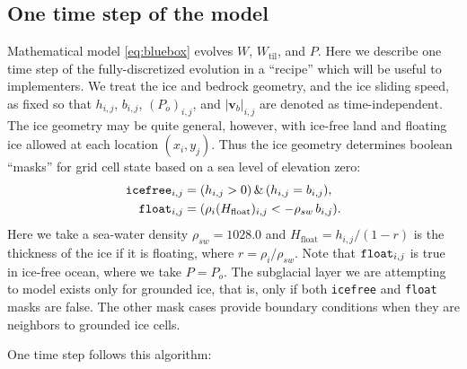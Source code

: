 \documentclass[11pt,final]{amsart}
\newcommand\bv{\mathbf{v}}
\newcommand{\Wtil}{W_{\text{til}}}
\begin{document}
\subsection*{One time step of the model}  Mathematical model \eqref{eq:bluebox} evolves $W$, $\Wtil$, and $P$.  Here we describe one time step of the fully-discretized evolution in a ``recipe'' which will be useful to implementers.  We treat the ice and bedrock geometry, and the ice sliding speed, as fixed so that $h_{i,j}$, $b_{i,j}$, $(P_o)_{i,j}$, and $|\bv_b|_{i,j}$ are denoted as time-independent.  The ice geometry may be quite general, however, with ice-free land and floating ice allowed at each location $(x_i,y_j)$.  Thus the ice geometry determines boolean ``masks'' for grid cell state based on a sea level of elevation zero:
\begin{align*}
\text{\texttt{icefree}}_{i,j} &= (h_{i,j} > 0)\, \&\, (h_{i,j} = b_{i,j}), \\
\text{\texttt{float}}_{i,j}   &= (\rho_i (H_{\text{float}})_{i,j} < - \rho_{sw}\, b_{i,j}).
\end{align*}
Here we take a sea-water density $\rho_{sw}=1028.0$ and $H_{\text{float}}=h_{i,j} / (1 - r)$  is the thickness of the ice if it is floating, where $r=\rho_i / \rho_{sw}$.  Note that $\text{\texttt{float}}_{i,j}$ is true in ice-free ocean, where we take $P=P_o$.  The subglacial layer we are attempting to model exists only for grounded ice, that is, only if both \texttt{icefree} and \texttt{float} masks are false.  The other mask cases provide boundary conditions when they are neighbors to grounded ice cells.

One time step follows this algorithm:
\end{document}
